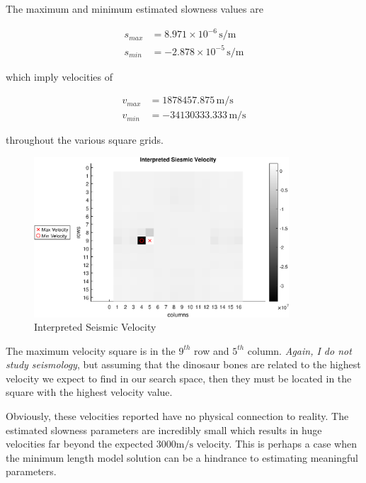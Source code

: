The maximum and minimum estimated slowness values are 

\begin{align*}
	s_{max} &= 8.971 \times 10^{-6} \, \unit{\second\per\meter} \\
	s_{min} &= -2.878 \times 10^{-5} \, \unit{\second\per\meter}
\end{align*}

which imply velocities of

\begin{align*}
	v_{max} &= 1878457.875 \, \unit{\meter\per\second} \\
	v_{min} &= -34130333.333 \, \unit{\meter\per\second}
\end{align*}

throughout the various square grids. 

\begin{figure}[h] 
	\centering
	\includegraphics[width=0.85\textwidth]{./images/prob2_partA_seismic_velocity.eps}
	\caption{Interpreted Seismic Velocity}
	\label{fig: prob2 part A seismic velocity}
\end{figure}
\FloatBarrier

The maximum velocity square is in the $9^{th}$ row and $5^{th}$ column. \textit{Again, I do not study seismology}, but assuming that the dinosaur bones are related to the highest velocity we expect to find in our search space, then they must be located in the square with the highest velocity value.

Obviously, these velocities reported have no physical connection to reality. The estimated slowness parameters are incredibly small which results in huge velocities far beyond the expected $3000 \unit{\meter\per\second}$ velocity. This is perhaps a case when the minimum length model solution can be a hindrance to estimating meaningful parameters. \newline

